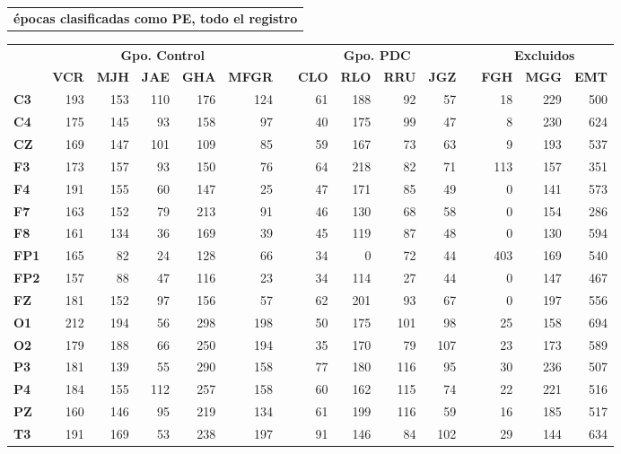 \begin{SidewaysTable}
\centering
\begin{tabular}{c}
\textbf{\'epocas clasificadas como PE, todo el registro}
\vspace{1em}
\end{tabular}
\begin{tabular}{lrrrrrcrrrrcrrr}
\toprule
& \multicolumn{5}{c}{\textbf{Gpo. Control}} && 
  \multicolumn{4}{c}{\textbf{Gpo. PDC}} && 
  \multicolumn{3}{c}{\textbf{Excluidos}}\\
\cmidrule{2-6} \cmidrule{8-11} \cmidrule{13-15}
& \textbf{VCR} & \textbf{MJH} & \textbf{JAE} & \textbf{GHA} & \textbf{MFGR} & \phantom{l}
& \textbf{CLO} & \textbf{RLO} & \textbf{RRU} & \textbf{JGZ} & \phantom{l}
& \textbf{FGH} & \textbf{MGG} & \textbf{EMT} \\
\midrule
\textbf{C3} &193&153&110&176&124&&61 &188&92 &57 &&18&229&500 \\
\textbf{C4} &175&145&93 &158&97 &&40 &175&99 &47 &&8&230&624 \\
\textbf{CZ} &169&147&101&109&85 &&59 &167&73 &63 &&9&193&537 \\
\rowcolor{gris}
\textbf{F3} &173&157&93 &150&76 &&64 &218&82 &71 &&113&157&351 \\
\rowcolor{gris}
\textbf{F4} &191&155&60 &147&25 &&47 &171&85 &49 &&0&141&573 \\
\rowcolor{gris}
\textbf{F7} &163&152&79 &213&91 &&46 &130&68 &58 &&0&154&286 \\
\rowcolor{gris}
\textbf{F8} &161&134&36 &169&39 &&45 &119&87 &48 &&0&130&594 \\
\textbf{FP1}&165&82 &24 &128&66 &&34 &0  &72 &44 &&403&169&540 \\
\textbf{FP2}&157&88 &47 &116&23 &&34 &114&27 &44 &&0&147&467 \\
\textbf{FZ} &181&152&97 &156&57 &&62 &201&93 &67 &&0&197&556 \\
\rowcolor{gris}
\textbf{O1} &212&194&56 &298&198&&50 &175&101&98 &&25&158&694 \\
\rowcolor{gris}
\textbf{O2} &179&188&66 &250&194&&35 &170&79 &107&&23&173&589 \\
\textbf{P3} &181&139&55 &290&158&&77 &180&116&95 &&30&236&507 \\
\textbf{P4} &184&155&112&257&158&&60 &162&115&74 &&22&221&516 \\
\textbf{PZ} &160&146&95 &219&134&&61 &199&116&59 &&16&185&517 \\
\rowcolor{gris}
\textbf{T3} &191&169&53 &238&197&&91 &146&84 &102&&29&144&634 \\

\end{tabular}
\end{SidewaysTable}
